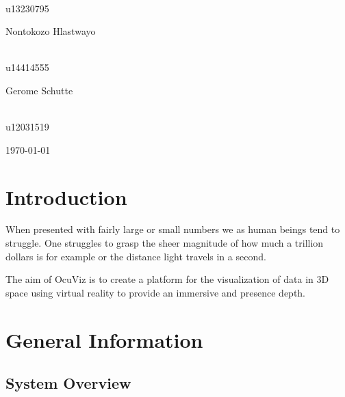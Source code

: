 \documentclass[a4paper,12pt]{article}
\begin{document}
\begin{titlepage}
\begin{center}
\begin{minipage}{0.4\textwidth}
\begin{flushright} \large
\emph{} \\
u13230795  
\end{flushright}
\end{minipage}
\begin{minipage}{0.4\textwidth}
\begin{flushleft} \large
Nontokozo Hlastwayo
\end{flushleft}
\end{minipage}
\begin{minipage}{0.4\textwidth}
\begin{flushright} \large
\emph{} \\
u14414555
\end{flushright}
\end{minipage}
\begin{minipage}{0.4\textwidth}
\begin{flushleft} \large
Gerome Schutte
\end{flushleft}
\end{minipage}
\begin{minipage}{0.4\textwidth}
\begin{flushright} \large
\emph{} \\
u12031519
\end{flushright}
\end{minipage}
\vfill

{\large \today}
\end{center}
\end{titlepage}
\footnotesize
\normalsize

%
%
%
%
%
%
%

\tableofcontents
\newpage
\setlength{\parindent}{0em}
\section{Introduction}
When presented with fairly large or small numbers we as human beings tend to struggle. One struggles to grasp the sheer magnitude of how much a trillion dollars is for example or the distance light travels in a second.

The aim of OcuViz is to create a platform for the visualization of data in 3D space using virtual reality to provide an immersive and presence depth.

\section{General Information}
\subsection{System Overview}
\end{document}

